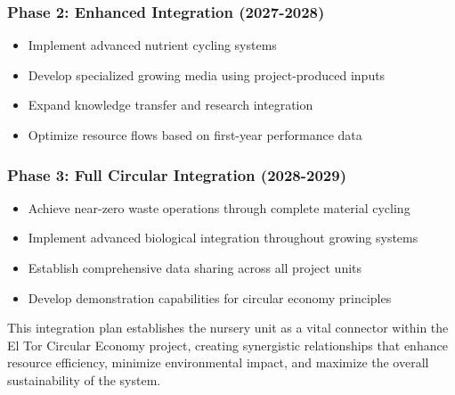 \subsubsection{Phase 2: Enhanced Integration (2027-2028)}
\begin{itemize}
    \item Implement advanced nutrient cycling systems
    \item Develop specialized growing media using project-produced inputs
    \item Expand knowledge transfer and research integration
    \item Optimize resource flows based on first-year performance data
\end{itemize}

\subsubsection{Phase 3: Full Circular Integration (2028-2029)}
\begin{itemize}
    \item Achieve near-zero waste operations through complete material cycling
    \item Implement advanced biological integration throughout growing systems
    \item Establish comprehensive data sharing across all project units
    \item Develop demonstration capabilities for circular economy principles
\end{itemize}

This integration plan establishes the nursery unit as a vital connector within the El Tor Circular Economy project, creating synergistic relationships that enhance resource efficiency, minimize environmental impact, and maximize the overall sustainability of the system. 